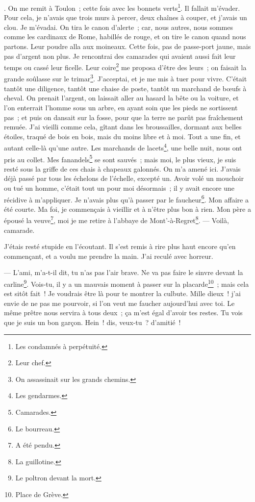 \documentclass[french,twoside]{book} %
\begin{document}
{ }. On me remit à Toulon ; cette fois avec les bonnets verts\footnote{ \noindent Les condamnés à perpétuité.
 }. Il fallait m’évader. Pour cela, je n’avais que trois murs à percer, deux chaînes à couper, et j’avais un clou. Je m’évadai. On tira le canon d’alerte ; car, nous autres, nous sommes comme les cardinaux de Rome, habillés de rouge, et on tire le canon quand nous partons. Leur poudre alla aux moineaux. Cette fois, pas de passe-port jaune, mais pas d’argent non plus. Je rencontrai des camarades qui avaient aussi fait leur temps ou cassé leur ficelle. Leur coire\footnote{ \noindent Leur chef.
 } me proposa d’être des leurs ; on faisait la grande soûlasse sur le trimar\footnote{ \noindent On assassinait sur les grands chemins.
 }. J’acceptai, et je me mis à tuer pour vivre. C’était tantôt une diligence, tantôt une chaise de poste, tantôt un marchand de bœufs à cheval. On prenait l’argent, on laissait aller au hasard la bête ou la voiture, et l’on enterrait l’homme sous un arbre, en ayant soin que les pieds ne sortissent pas ; et puis on dansait sur la fosse, pour que la terre ne parût pas fraîchement remuée. J’ai vieilli comme cela, gîtant dans les broussailles, dormant aux belles étoiles, traqué de bois en bois, mais du moins libre et à moi. Tout a une fin, et autant celle-là qu’une autre. Les marchands de lacets\footnote{ \noindent Les gendarmes.
 }, une belle nuit, nous ont pris au collet. Mes fanandels\footnote{ \noindent Camarades.
 } se sont sauvés ; mais moi, le plus vieux, je suis resté sous  la griffe de ces chais à chapeaux galonnés. On m’a amené ici. J’avais déjà passé par tous les échelons de l’échelle, excepté un. Avoir volé un mouchoir ou tué un homme, c’était tout un pour moi désormais ; il y avait encore une récidive à m’appliquer. Je n’avais plus qu’à passer par le faucheur\footnote{ \noindent Le bourreau.
 }. Mon affaire a été courte. Ma foi, je commençais à vieillir et à n’être plus bon à rien. Mon père a épousé la veuve\footnote{ \noindent A été pendu.
 }, moi je me retire à l’abbaye de Mont’-à-Regret\footnote{ \noindent La guillotine.
 }. — Voilà, camarade.\par
J’étais resté stupide en l’écoutant. Il s’est remis à rire plus haut encore qu’en commençant, et a voulu me prendre la main. J’ai reculé avec horreur.\par
— L’ami, m’a-t-il dit, tu n’as pas l’air brave. Ne va pas faire le sinvre devant la carline\footnote{ \noindent Le poltron devant la mort.
 }. Vois-tu, il y a un mauvais moment à passer sur la placarde\footnote{ \noindent Place de Grève.
 } ; mais cela est sitôt fait ! Je voudrais être là pour te montrer la culbute. Mille dieux ! j’ai envie de ne pas me pourvoir, si l’on veut me faucher aujourd’hui avec toi. Le même prêtre nous servira à tous deux ; ça m’est égal d’avoir tes restes. Tu vois que je suis un bon garçon. Hein ! dis, veux-tu ? d’amitié !\par
\end{document}
